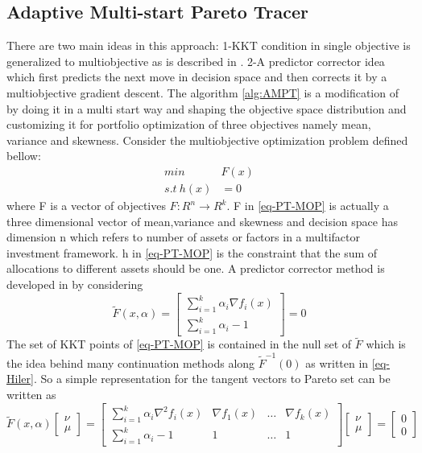 \documentclass[12pt,a4paper]{article}
\numberwithin{equation}{section}
\begin{document}
\subsection{Adaptive Multi-start Pareto Tracer}
There are two main ideas in this approach: 1-KKT condition in single objective is generalized to multiobjective as is described in \citep{Hillermeier2001}. 2-A predictor corrector idea which first predicts the next move in decision space and then corrects it by a multiobjective gradient descent. The algorithm \ref{alg:AMPT} is a modification of \citep{Martin2018} by doing it in a multi start way and shaping the objective space distribution and customizing it for portfolio optimization of three objectives namely mean, variance and skewness.
Consider the multiobjective optimization problem defined bellow:
\begin{equation}
\begin{split} \label{eq-PT-MOP}
min \  &F(x) \\
s.t \ h(x)&=0
\end{split}
\end{equation}
where F is a vector of objectives $F:R^{n}\rightarrow R^{k}$. F in \ref{eq-PT-MOP} is actually a three dimensional vector of mean,variance and skewness and decision space has dimension n which refers to number of assets or factors in a multifactor investment framework. h in \ref{eq-PT-MOP} is the constraint that the sum of allocations to different assets should be one. A predictor corrector method is developed in \citep{Hillermeier2001} by considering
\begin{equation} \label{eq-Hiler}
\tilde{F}(x,\alpha)=\begin{bmatrix}
         \sum_{i=1}^{k}\alpha_{i}\nabla f_{i}(x) \\
         \sum_{i=1}^{k}\alpha_{i}-1  
         \end{bmatrix}=0
\end{equation}
The set of KKT points of \ref{eq-PT-MOP} is contained in the null set of $\tilde{F}$ which is the idea behind many continuation methods along $\tilde{F}^{-1}(0)$  as written in \ref{eq-Hiler}. So a simple representation for the tangent vectors to Pareto set can be written as
\begin{equation} \label{eq-Hiler-prime}
\tilde{F}(x,\alpha)\begin{bmatrix}
\nu  \\
\mu
\end{bmatrix}
=\begin{bmatrix}
         \sum_{i=1}^{k}\alpha_{i}\nabla^{2} f_{i}(x) & \nabla f_{1}(x) & \hdots & \nabla f_{k}(x)  \\
         \sum_{i=1}^{k}\alpha_{i}-1    & 1 & \hdots & 1
         \end{bmatrix} \begin{bmatrix}
         \nu  \\
         \mu
         \end{bmatrix}=\begin{bmatrix}
         0  \\
         0
         \end{bmatrix}
\end{equation}
\end{document}
